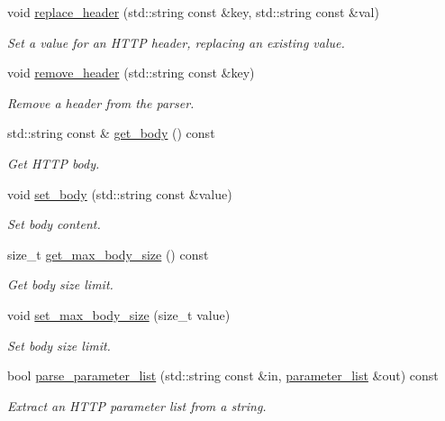 \begin{DoxyCompactItemize}
void \hyperlink{classwebsocketpp_1_1http_1_1parser_1_1parser_aba2991b2aa41ca60d9427950502b0b93}{replace\+\_\+header} (std\+::string const \&key, std\+::string const \&val)
\begin{DoxyCompactList}\small\item\em Set a value for an H\+T\+T\+P header, replacing an existing value. \end{DoxyCompactList}\item 
void \hyperlink{classwebsocketpp_1_1http_1_1parser_1_1parser_a64ff49a6a1ddbf70b9767874ffdd513e}{remove\+\_\+header} (std\+::string const \&key)
\begin{DoxyCompactList}\small\item\em Remove a header from the parser. \end{DoxyCompactList}\item 
std\+::string const \& \hyperlink{classwebsocketpp_1_1http_1_1parser_1_1parser_ad408fca545841a0bb5d4ad0a88fe0c72}{get\+\_\+body} () const 
\begin{DoxyCompactList}\small\item\em Get H\+T\+T\+P body. \end{DoxyCompactList}\item 
void \hyperlink{classwebsocketpp_1_1http_1_1parser_1_1parser_a71a4989eaa0ca802cf77678d0ca2d70d}{set\+\_\+body} (std\+::string const \&value)
\begin{DoxyCompactList}\small\item\em Set body content. \end{DoxyCompactList}\item 
size\+\_\+t \hyperlink{classwebsocketpp_1_1http_1_1parser_1_1parser_a8d3023125bdc97911f6c471070aee5b5}{get\+\_\+max\+\_\+body\+\_\+size} () const 
\begin{DoxyCompactList}\small\item\em Get body size limit. \end{DoxyCompactList}\item 
void \hyperlink{classwebsocketpp_1_1http_1_1parser_1_1parser_ab6583e865254d1608732498d839d8385}{set\+\_\+max\+\_\+body\+\_\+size} (size\+\_\+t value)
\begin{DoxyCompactList}\small\item\em Set body size limit. \end{DoxyCompactList}\item 
bool \hyperlink{classwebsocketpp_1_1http_1_1parser_1_1parser_ab006d1cca50947f396a2d7ec9511c8ef}{parse\+\_\+parameter\+\_\+list} (std\+::string const \&in, \hyperlink{namespacewebsocketpp_1_1http_a2c285bc959df5a63bf962bed842fccfb}{parameter\+\_\+list} \&out) const 
\begin{DoxyCompactList}\small\item\em Extract an H\+T\+T\+P parameter list from a string. \end{DoxyCompactList}\end{DoxyCompactItemize}
